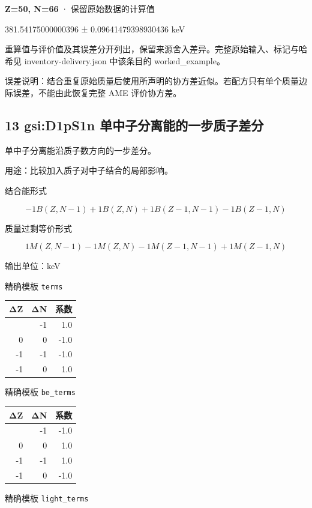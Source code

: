 \documentclass[
  11pt,
  letterpaper,
]{article}
\begin{document}
\textbf{Z=50, N=66} · 保留原始数据的计算值

381.54175000000396 ± 0.09641479398930436 keV

重算值与评价值及其误差分开列出，保留来源舍入差异。完整原始输入、标记与哈希见
inventory-delivery.json 中该条目的 worked\_example。

误差说明：结合重复原始质量后使用所声明的协方差近似。若配方只有单个质量边际误差，不能由此恢复完整
AME 评价协方差。

\subsection{13 gsi:D1pS1n
单中子分离能的一步质子差分}\label{gsid1ps1n-ux5355ux4e2dux5b50ux5206ux79bbux80fdux7684ux4e00ux6b65ux8d28ux5b50ux5deeux5206}

单中子分离能沿质子数方向的一步差分。

用途：比较加入质子对中子结合的局部影响。

结合能形式

\[
-1B(Z,N-1)+1B(Z,N)+1B(Z-1,N-1)-1B(Z-1,N)
\]

质量过剩等价形式

\[
1M(Z,N-1)-1M(Z,N)-1M(Z-1,N-1)+1M(Z-1,N)
\]

输出单位：keV

精确模板 \texttt{terms}

\begin{longtable}[]{@{}rrr@{}}
\toprule\noalign{}
ΔZ & ΔN & 系数 \\
\midrule\noalign{}
\endhead
\bottomrule\noalign{}
\endlastfoot
0 & -1 & 1.0 \\
0 & 0 & -1.0 \\
-1 & -1 & -1.0 \\
-1 & 0 & 1.0 \\
\end{longtable}

精确模板 \texttt{be\_terms}

\begin{longtable}[]{@{}rrr@{}}
\toprule\noalign{}
ΔZ & ΔN & 系数 \\
\midrule\noalign{}
\endhead
\bottomrule\noalign{}
\endlastfoot
0 & -1 & -1.0 \\
0 & 0 & 1.0 \\
-1 & -1 & 1.0 \\
-1 & 0 & -1.0 \\
\end{longtable}

精确模板 \texttt{light\_terms}
\end{document}
